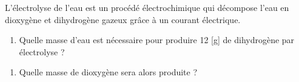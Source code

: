 \documentclass[
  11pt,
  a4paper,
  openany]{book}
\providecommand{\tightlist}{%
  \setlength{\itemsep}{0pt}\setlength{\parskip}{0pt}}
\begin{document}
\newpage

\begin{Exercise}

L'électrolyse de l'eau est un procédé électrochimique qui décompose l'eau en dioxygène et dihydrogène gazeux grâce à un courant électrique.

\begin{enumerate}
\def\labelenumi{\arabic{enumi}.}
\tightlist
\item
  Quelle masse d'eau est nécessaire pour produire 12 {[}g{]} de dihydrogène par électrolyse ?
\end{enumerate}


\begin{enumerate}
\def\labelenumi{\arabic{enumi}.}
\setcounter{enumi}{1}
\tightlist
\item
  Quelle masse de dioxygène sera alors produite ?
\end{enumerate}


\end{Exercise}
\end{document}
